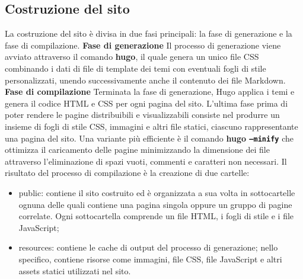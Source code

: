 \documentclass[target=bach,aauheader=]{thud}
\begin{document}
\subsection{Costruzione del sito}
La costruzione del sito è divisa in due fasi principali: la fase di generazione e la fase di compilazione.
\newline
\newline
\textbf{{\fontsize{12}{14}\selectfont Fase di generazione}}
\newline \newline
Il processo di generazione viene avviato attraverso il comando \textbf{hugo}, il quale genera un unico file CSS combinando i dati di file di template dei temi con eventuali fogli di stile personalizzati, unendo successivamente anche il contenuto dei file Markdown.
\newline \newline
\textbf{{\fontsize{12}{14}\selectfont Fase di compilazione}}
\newline \newline
Terminata la fase di generazione, Hugo applica i temi e genera il codice HTML e CSS per ogni pagina del sito. L'ultima fase prima di poter rendere le pagine distribuibili e visualizzabili consiste nel produrre un insieme di fogli di stile CSS, immagini e
altri file statici, ciascuno rappresentante una pagina del sito. 
Una variante più efficiente è il comando \textbf{hugo \texttt{--minify}} che ottimizza il caricamento delle pagine minimizzando la dimensione dei file attraverso l'eliminazione di spazi vuoti, commenti e caratteri non necessari.
\newline
Il risultato del processo di compilazione è la creazione di due cartelle:
\begin{itemize}
    \item public: contiene il sito costruito ed è organizzata a sua volta in sottocartelle ognuna delle quali contiene una pagina singola oppure un gruppo di pagine correlate. Ogni sottocartella comprende un file HTML, i fogli di stile e i file JavaScript;
    \item resources: contiene le cache di output del processo di generazione; nello specifico, contiene risorse come immagini, file CSS, file JavaScript e altri assets statici utilizzati nel sito.
\end{itemize}

\end{document}
